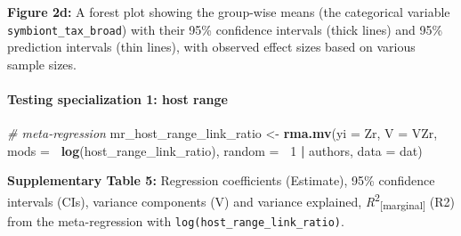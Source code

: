 \documentclass[
]{article}
\newenvironment{Shaded}{\begin{snugshade}}{\end{snugshade}}
\newcommand{\CommentTok}[1]{\textcolor[rgb]{0.56,0.35,0.01}{\textit{#1}}}
\newcommand{\DataTypeTok}[1]{\textcolor[rgb]{0.13,0.29,0.53}{#1}}
\newcommand{\DecValTok}[1]{\textcolor[rgb]{0.00,0.00,0.81}{#1}}
\newcommand{\KeywordTok}[1]{\textcolor[rgb]{0.13,0.29,0.53}{\textbf{#1}}}
\newcommand{\NormalTok}[1]{#1}
\newcommand{\OperatorTok}[1]{\textcolor[rgb]{0.81,0.36,0.00}{\textbf{#1}}}
\newcommand{\StringTok}[1]{\textcolor[rgb]{0.31,0.60,0.02}{#1}}
\begin{document}
\textbf{Figure 2d:} A forest plot showing the group-wise means (the
categorical variable \texttt{symbiont\_tax\_broad}) with their 95\%
confidence intervals (thick lines) and 95\% prediction intervals (thin
lines), with observed effect sizes based on various sample sizes.

\hypertarget{testing-specialization-1-host-range}{%
\paragraph{Testing specialization 1: host
range}\label{testing-specialization-1-host-range}}

\begin{Shaded}
\begin{Highlighting}[]
\CommentTok{# meta-regression}
\NormalTok{mr_host_range_link_ratio <-}\StringTok{ }\KeywordTok{rma.mv}\NormalTok{(}\DataTypeTok{yi =}\NormalTok{ Zr, }\DataTypeTok{V =}\NormalTok{ VZr, }\DataTypeTok{mods =} \OperatorTok{~}\KeywordTok{log}\NormalTok{(host_range_link_ratio), }
    \DataTypeTok{random =} \OperatorTok{~}\DecValTok{1} \OperatorTok{|}\StringTok{ }\NormalTok{authors, }\DataTypeTok{data =}\NormalTok{ dat)}
\end{Highlighting}
\end{Shaded}

\textbf{Supplementary Table 5:} Regression coefficients (Estimate), 95\%
confidence intervals (CIs), variance components (V) and variance
explained, \emph{R}\textsuperscript{2}\textsubscript{{[}marginal{]}}
(R2) from the meta-regression with
\texttt{log(host\_range\_link\_ratio)}.
\end{document}
